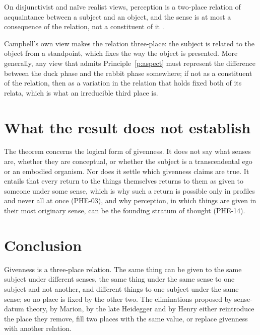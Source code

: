 \documentclass{situationist-preprint}
\begin{document}
\begin{objection}[Externalism]
On disjunctivist and naïve realist views, perception is a two-place relation of acquaintance between a subject and an object, and the sense is at most a consequence of the relation, not a constituent of it \citep{Campbell2002}.
\end{objection}

\begin{reply}
Campbell's own view makes the relation three-place: the subject is related to the object from a standpoint, which fixes the way the object is presented. More generally, any view that admits Principle~\ref{p:aspect} must represent the difference between the duck phase and the rabbit phase somewhere; if not as a constituent of the relation, then as a variation in the relation that holds fixed both of its relata, which is what an irreducible third place is.
\end{reply}

\section{What the result does not establish}

The theorem concerns the logical form of givenness. It does not say what senses are, whether they are conceptual, or whether the subject is a transcendental ego or an embodied organism. Nor does it settle which givenness claims are true. It entails that every return to the things themselves returns to them as given to someone under some sense, which is why such a return is possible only in profiles and never all at once (PHE-03), and why perception, in which things are given in their most originary sense, can be the founding stratum of thought (PHE-14).

\section{Conclusion}

Givenness is a three-place relation. The same thing can be given to the same subject under different senses, the same thing under the same sense to one subject and not another, and different things to one subject under the same sense; so no place is fixed by the other two. The eliminations proposed by sense-datum theory, by Marion, by the late Heidegger and by Henry either reintroduce the place they remove, fill two places with the same value, or replace givenness with another relation.
\end{document}
